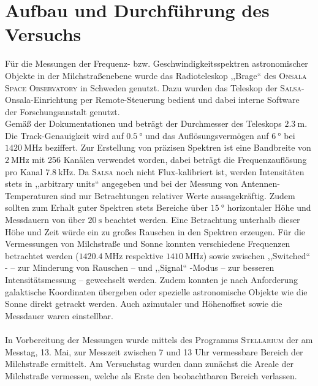 \section{Aufbau und Durchführung des Versuchs}
\label{sec:Aufbau}
Für die Messungen der Frequenz- bzw. Geschwindigkeitsspektren astronomischer Objekte in der Milchstraßenebene wurde das Radioteleskop ,,Brage`` des \textsc{Onsala Space Observatory} in Schweden genutzt.
Dazu wurden das Teleskop der \textsc{Salsa}-Onsala-Einrichtung per Remote-Steuerung bedient und dabei interne Software der Forschungsanstalt genutzt.\\
Gemäß der Dokumentationen \cite{Usermanual} und \cite{AntennaResp} beträgt der Durchmesser des Teleskops $\SI{2.3}{\metre}$. Die Track-Genauigkeit wird auf $\SI{0.5}{\degree}$ und das Auflösungsvermögen auf $\SI{6}{\degree}$ bei $\SI{1420}{\mega \hertz}$ beziffert.
Zur Erstellung von präzisen Spektren ist eine Bandbreite von $\SI{2}{\mega \hertz}$ mit 256 Kanälen verwendet worden, dabei beträgt die Frequenzauflösung pro Kanal $\SI{7.8}{\kilo \hertz}$.
Da \textsc{Salsa} noch nicht Flux-kalibriert ist, werden Intensitäten stets in ,,arbitrary units`` angegeben und bei der Messung von Antennen-Temperaturen sind nur Betrachtungen relativer Werte aussagekräftig.
Zudem sollten zum Erhalt guter Spektren stets Bereiche über $\SI{15}{\degree}$ horizontaler Höhe und Messdauern von über $\SI{20}{\second}$ beachtet werden. Eine Betrachtung unterhalb dieser Höhe und Zeit würde ein zu großes Rauschen in den Spektren erzeugen.
Für die Vermessungen von Milchstraße und Sonne konnten verschiedene Frequenzen betrachtet werden ($\SI{1420.4}{\mega \hertz}$ respektive $\SI{1410}{\mega \hertz}$) sowie zwischen  ,,Switched`` - -- zur Minderung von Rauschen --  und ,,Signal`` -Modus -- zur besseren Intensitätsmessung -- gewechselt werden.
Zudem konnten je nach Anforderung galaktische Koordinaten übergeben oder spezielle astronomische Objekte wie die Sonne direkt getrackt werden.
Auch azimutaler und Höhenoffset sowie die Messdauer waren einstellbar.\\ 
\\ 
In Vorbereitung der Messungen wurde mittels des Programms \textsc{Stellarium} der am Messtag, 13. Mai, zur Messzeit zwischen 7 und 13 Uhr vermessbare Bereich der Milchstraße ermittelt.
Am Versuchstag wurden dann zunächst die Areale der Milchstraße vermessen, welche als Erste den beobachtbaren Bereich verlassen.
